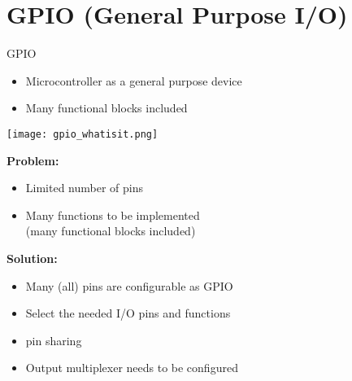 \section{GPIO (General Purpose I/O)}

\begin{definition}{GPIO}\\
    \begin{minipage}{0.5\linewidth}
    \begin{itemize}
        \item Microcontroller as a general purpose device
        \item Many functional blocks included
    \end{itemize}
    \texttt{[image: gpio\_whatisit.png]}
    \end{minipage}
    \begin{minipage}{0.5\linewidth}
    \vspace{-5mm}
    \textbf{Problem:}
    \begin{itemize}
        \item Limited number of pins
        \item Many functions to be implemented \\ (many functional blocks included)
    \end{itemize}
    \textbf{Solution:}
    \begin{itemize}
        \item Many (all) pins are configurable as GPIO
        \item Select the needed I/O pins and functions
        \item \oq pin sharing\cq
        \item Output multiplexer needs to be configured
    \end{itemize}
    \end{minipage}
\end{definition}



